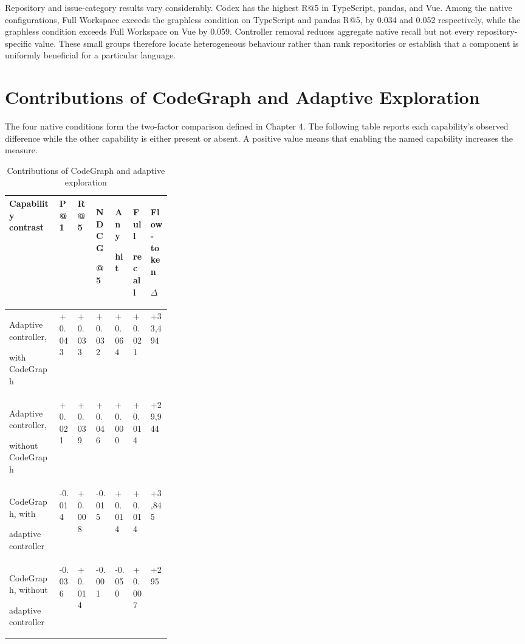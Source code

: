 Repository and issue-category results vary considerably. Codex has the highest R@5 in TypeScript, pandas, and Vue. Among the native configurations, Full Workspace exceeds the graphless condition on TypeScript and pandas R@5, by 0.034 and 0.052 respectively, while the graphless condition exceeds Full Workspace on Vue by 0.059. Controller removal reduces aggregate native recall but not every repository-specific value. These small groups therefore locate heterogeneous behaviour rather than rank repositories or establish that a component is uniformly beneficial for a particular language.

\section{Contributions of CodeGraph and Adaptive Exploration}\label{sec:contributions-of-codegraph-and-adaptive-exploration}

The four native conditions form the two-factor comparison defined in Chapter 4. The following table reports each capability's observed difference while the other capability is either present or absent. A positive value means that enabling the named capability increases the measure.

\begin{table}[htbp]
\centering
\caption{Contributions of CodeGraph and adaptive exploration}\label{tab:contributions-of-codegraph-and-adaptive-exploration-3}

\begingroup
\small
\setlength{\tabcolsep}{3pt}
\renewcommand{\arraystretch}{1.10}
\begin{tabularx}{0.97\linewidth}{@{}L{0.31\linewidth}*{6}{Z}@{}}
\toprule
\textbf{Capability contrast} & \textbf{P@1} & \textbf{R@5} & \textbf{NDCG}\par\textbf{@5} & \textbf{Any}\par\textbf{hit} & \textbf{Full}\par\textbf{recall} & \textbf{Flow-token}\par\textbf{$\Delta$} \\
\midrule
Adaptive controller,\par with CodeGraph & +0.043 & +0.033 & +0.032 & +0.064 & +0.021 & +33,494 \\
Adaptive controller,\par without CodeGraph & +0.021 & +0.039 & +0.046 & +0.000 & +0.014 & +29,944 \\
CodeGraph, with\par adaptive controller & -0.014 & +0.008 & -0.015 & +0.014 & +0.014 & +3,845 \\
CodeGraph, without\par adaptive controller & -0.036 & +0.014 & -0.001 & -0.050 & +0.007 & +295 \\
\bottomrule
\end{tabularx}
\endgroup
\end{table}
\FloatBarrier

